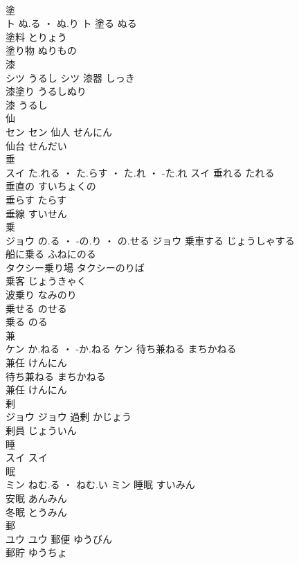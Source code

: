 \documentclass[8pt]{extreport}
\begin{document}
\begin{CJK}{UTF8}{min}
\\	塗	
\\	ト	ぬ.る ・ ぬ.り	ト	塗る	ぬる	
\\	塗料	とりょう	
\\	塗り物	ぬりもの	
\\	漆	
\\	シツ	うるし	シツ	漆器	しっき	
\\	漆塗り	うるしぬり	
\\	漆	うるし	
\\	仙	
\\	セン		セン	仙人	せんにん	
\\	仙台	せんだい	
\\	垂	
\\	スイ	た.れる ・ た.らす ・ た.れ ・ -た.れ	スイ	垂れる	たれる	
\\	垂直の	すいちょくの	
\\	垂らす	たらす	
\\	垂線	すいせん	
\\	乗	
\\	ジョウ	の.る ・ -の.り ・ の.せる	ジョウ	乗車する	じょうしゃする	
\\	船に乗る	ふねにのる	
\\	タクシー乗り場	タクシーのりば	
\\	乗客	じょうきゃく	
\\	波乗り	なみのり	
\\	乗せる	のせる	
\\	乗る	のる	
\\	兼	
\\	ケン	か.ねる ・ -か.ねる	ケン	待ち兼ねる	まちかねる	
\\	兼任	けんにん	
\\	待ち兼ねる	まちかねる	
\\	兼任	けんにん	
\\	剰	
\\	ジョウ		ジョウ	過剰	かじょう	
\\	剰員	じょういん	
\\	睡	
\\	スイ		スイ																																			
\\	眠	
\\	ミン	ねむ.る ・ ねむ.い	ミン	睡眠	すいみん	
\\	安眠	あんみん	
\\	冬眠	とうみん	
\\	郵	
\\	ユウ		ユウ	郵便	ゆうびん	
\\	郵貯	ゆうちょ	

\end{CJK}
\end{document}
